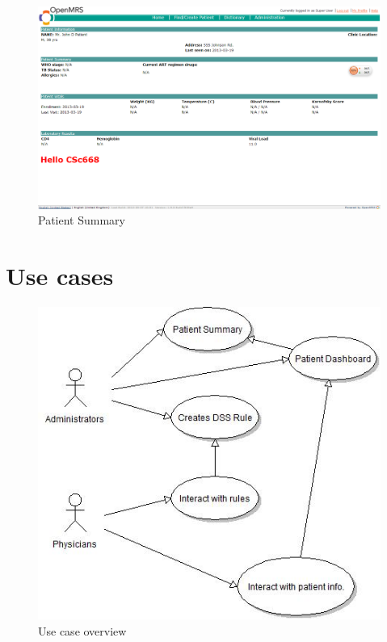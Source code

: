 \documentclass[12pt,letterpaper]{article}
\begin{document}
\begin{figure}\begin{center}
\includegraphics[width=6.5in]{summary.png}
\end{center}
\caption{Patient Summary} \label{fig:PATIENT_SUMMARY_ALERT}
\end{figure}

\newpage 
\section{Use cases}

\begin{figure}\begin{center}
\includegraphics{use_case_diagram.png}
\end{center}
\caption{Use case overview}
\label{fig:USE_CASE_OVERVIEW}
\end{figure}
\end{document}
